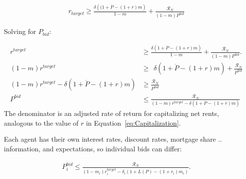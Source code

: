 \begin{eqnarray}
r_{target} \ge \frac{\delta \left((1+ \dot P - (1+r)m\right)}{1-m} + \frac{\mathcal{R}_N}{(1-m)P^{bid}}
\end{eqnarray}

Solving for $P_{bid}$:


\begin{align}
r^{target} &\ge \frac{\delta \left(1 + \dot P - (1+r)m\right)}{1-m}   +\frac{\mathcal{R}_N}{(1-m)P^{bid}}. \nonumber \\
(1-m)r^{target} &\ge \ \ \delta \left(1 + \dot P - (1+r)m\right) + \frac{\mathcal{R}_N}{P^{bid}} \nonumber \\ %
(1-m)r^{target} - \delta \left(1 + \dot P - (1+r)m\right)  &\ge  \frac{\mathcal{R}_N}{P^{bid}} \nonumber\\
P^{bid} & \le    \frac{\mathcal{R}_N}{(1-m)r^{target}-\delta \left(1 + \dot P - (1+r)m\right)} 
\label{eqn-bid-price1}
\end{align}
The denominator is an adjusted rate of return for capitalizing net rents, analogous to the value of $r$ in Equation~\ref{eq:Capitalization}. 

Each agent has their own interest rates, discount rates, mortgage share .. information, and expectations, so individual bids can differ:

\begin{align}
P_i^{bid} \le   \frac{\mathcal{R}_N}{(1-m_i)r_i^{target} - \delta_i \left(1 + L(P) - (1+r_i)m_i \right)}.
\label{eqn-bid-price2}
\end{align}




